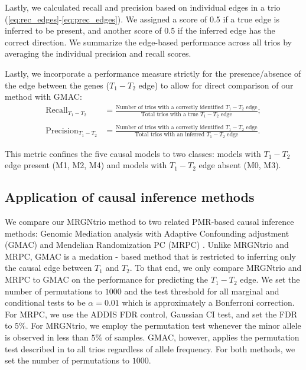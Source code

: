 \documentclass[12pt,letterpaper]{report}
\begin{document}
\begin{doublespace}
Lastly, we calculated recall and precision based on individual edges in a trio (\autoref{eq:rec_edges}-\ref{eq:prec_edges}).  We assigned a score of 0.5 if a true edge is inferred to be present, and another score of 0.5 if the inferred edge has the correct direction.	We summarize the edge-based performance across all trios by averaging the individual precision and recall scores.

Lastly, we incorporate a performance measure strictly for the presence/absence of the edge between the genes ($T_1 - T_2$ edge) to allow for direct comparison of our method with GMAC:
\begin{align}
	\text{Recall}_\text{$T_1 - T_2$} &= \frac{\text{Number of trios with a correctly identified $T_1 - T_2$ edge}}{\text{Total trios with a true $T_1 - T_2$ edge}}; \label{eq:rec_tedge}\\
	\nonumber \\ 
	\text{Precision}_\text{$T_1 - T_2$} &= \frac{\text{Number of trios with a correctly identified $T_1 - T_2$ edge}}{\text{Total trios with an inferred $T_1 - T_2$ edge}}. \label{eq:prec_tedge}
\end{align}


\noindent This metric confines the five causal models to two classes: models with $T_1 - T_2$ edge present (M1, M2, M4) and models with $T_1 - T_2$ edge absent (M0, M3). 

\subsection{Application of causal inference methods}

We compare our MRGNtrio method to two related PMR-based causal inference methods: Genomic Mediation analysis with Adaptive Confounding adjustment (GMAC) \cite{yang2017identifying} and Mendelian Randomization PC (MRPC) \cite{badsha2019learning}. Unlike MRGNtrio and MRPC, GMAC is a medation - based method that is restricted to inferring only the causal edge between $T_1$ and $T_2$. To that end, we only compare MRGNtrio and MRPC to GMAC on the performance for predicting the $T_1 - T_2$ edge. We set the number of permutations to $1000$ and the test threshold for all marginal and conditional tests to be $\alpha = 0.01$ which is approximately a Bonferroni correction. For MRPC, we use the ADDIS FDR control, Gaussian CI test, and set the FDR to $5\%$. For MRGNtrio, we employ the permutation test whenever the minor allele is observed in less than $5\%$ of samples. GMAC, however, applies the permutation test described in to all trios regardless of allele frequency. For both methods, we set the number of permutations to $1000$. 


\end{doublespace}
\end{document}
